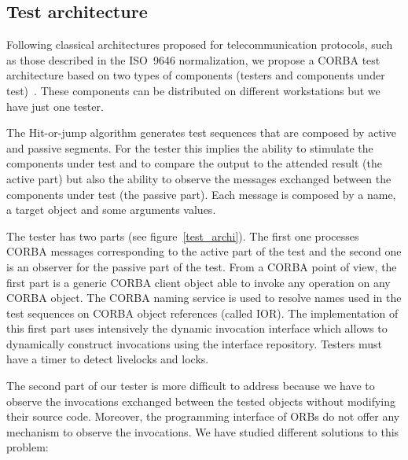 \subsection{Test architecture}

Following classical architectures proposed for telecommunication
protocols, such as those described in the ISO~9646 normalization, we
propose a CORBA test architecture based on two types of components
(testers and components under test)~\cite{luis}. These components can
be distributed on different workstations but we have just one tester.

The Hit-or-jump algorithm generates test sequences that are composed
by active and passive segments. For the tester this implies the
ability to stimulate the components under test and to compare the
output to the attended result (the active part) but also the ability
to observe the messages exchanged between the components under test
(the passive part). Each message is composed by a name, a target object
and some arguments values.

The tester has two parts (see figure~\ref{test_archi}). The first one
processes CORBA messages corresponding to the active part of the test
and the second one is an observer for the passive part of the test.
From a CORBA point of view, the first part is a generic CORBA client
object able to invoke any operation on any CORBA object. 
The CORBA naming service is used to resolve names used in the test sequences
on CORBA object references (called IOR). The implementation of this first
part uses intensively the dynamic invocation interface which allows to
dynamically construct invocations using the interface repository.
Testers must have a timer to detect livelocks and locks. 

The second part of our tester is more difficult to address because we have
to observe the invocations exchanged between the tested objects
without modifying their source code. Moreover, the programming
interface of ORBs do not offer any mechanism to observe the
invocations. We have studied different solutions to this problem:

